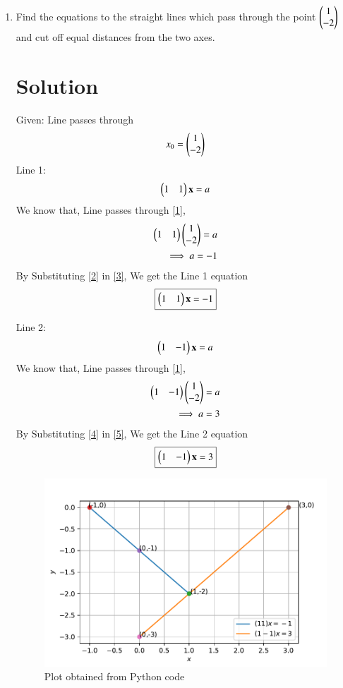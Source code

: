\documentclass[journal,12pt,twocolumn]{IEEEtran}
\renewcommand\thesection{\arabic{section}}
\begin{document}
\begin{enumerate}[label=\thesection.\arabic*.,ref=\thesection.\theenumi]

\item Find the equations to the straight lines which pass through the point $\begin{pmatrix}1\\-2\end{pmatrix}$ and cut off equal distances from the two axes.

\section{Solution}
Given: Line passes through
\begin{align}
x_0=\begin{pmatrix}1\\-2\end{pmatrix}
\label{1}
\end{align}
Line 1:
\begin{align}
\begin{pmatrix}1&1\end{pmatrix}\mathbf{x}=a
\label{3}
\end{align}
We know that, Line passes through \eqref{1},
\begin{align}
\begin{pmatrix}1&1\end{pmatrix}\begin{pmatrix}1\\-2\end{pmatrix}=a\\
\implies a = -1\label{2}
\end{align}
By Substituting \eqref{2} in \eqref{3}, We get the Line 1 equation
\begin{align}
\boxed{\begin{pmatrix}1&1\end{pmatrix}\mathbf{x}=-1}\label{6}
\end{align}


Line 2:
\begin{align}
\begin{pmatrix}1&-1\end{pmatrix}\mathbf{x}=a
\label{5}
\end{align}
We know that, Line passes through \eqref{1},
\begin{align}
\begin{pmatrix}1&-1\end{pmatrix}\begin{pmatrix}1\\-2\end{pmatrix}=a\\
\implies a = 3\label{4}
\end{align}
By Substituting \eqref{4} in \eqref{5}, We get the Line 2 equation
\begin{align}
\boxed{\begin{pmatrix}1&-1\end{pmatrix}\mathbf{x}=3}\label{7}
\end{align}


\begin{figure}[h]
	\centering
	\includegraphics[width=\columnwidth]{Figure_2.pdf}
	\caption{Plot obtained from Python code}
	\label{fig:Line}
\end{figure}


\end{enumerate}
\end{document}
